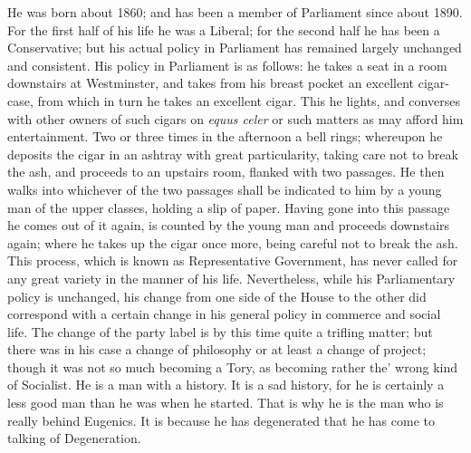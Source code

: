 \documentclass{book}
\begin{document}
He was born about 1860; and has been a member of Parliament since about 1890. For the first half of his life he was a Liberal; for the second half he has been a Conservative; but his actual policy in Parliament has remained largely unchanged and consistent. His policy in Parliament is as follows: he takes a seat in a room downstairs at Westminster, and takes from his breast pocket an excellent cigar-case, from which in turn he takes an excellent cigar. This he lights, and converses with other owners of such cigars on \emph{equus celer} or such matters as may afford him entertainment. Two or three times in the afternoon a bell rings; whereupon he deposits the cigar in an ashtray with great particularity, taking care not to break the ash, and proceeds to an upstairs room, flanked with two passages. He then walks into whichever of the two passages shall be indicated to him by a young man of the upper classes, holding a slip of paper. Having gone into this passage he comes out of it again, is counted by the young man and proceeds downstairs again; where he takes up the cigar once more, being careful not to break the ash. This process, which is known as Representative Government, has never called for any great variety in the manner of his life. Nevertheless, while his Parliamentary policy is unchanged, his change from one side of the House to the other did correspond with a certain change in his general policy in commerce and social life. The change of the party label is by this time quite a trifling matter; but there was in his case a change of philosophy or at least a change of project; though it was not so much becoming a Tory, as becoming rather the’ wrong kind of Socialist. He is a man with a history. It is a sad history, for he is certainly a less good man than he was when he started. That is why he is the man who is really behind Eugenics. It is because he has degenerated that he has come to talking of Degeneration.
\end{document}
